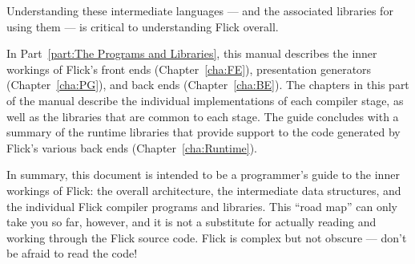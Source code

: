 \noindent Understanding these intermediate languages --- and the associated
libraries for using them --- is critical to understanding Flick overall.

In Part~\ref{part:The Programs and Libraries}, this manual describes the inner
workings of Flick's front ends (Chapter~\ref{cha:FE}), presentation generators
(Chapter~\ref{cha:PG}), and back ends (Chapter~\ref{cha:BE}).  The chapters in
this part of the manual describe the individual implementations of each
compiler stage, as well as the libraries that are common to each stage.  The
guide concludes with a summary of the runtime libraries that provide support to
the code generated by Flick's various back ends (Chapter~\ref{cha:Runtime}).

In summary, this document is intended to be a programmer's guide to the inner
workings of Flick: the overall architecture, the intermediate data structures,
and the individual Flick compiler programs and libraries.  This ``road map''
can only take you so far, however, and it is not a substitute for actually
reading and working through the Flick source code.  Flick is complex but not
obscure --- don't be afraid to read the code!



